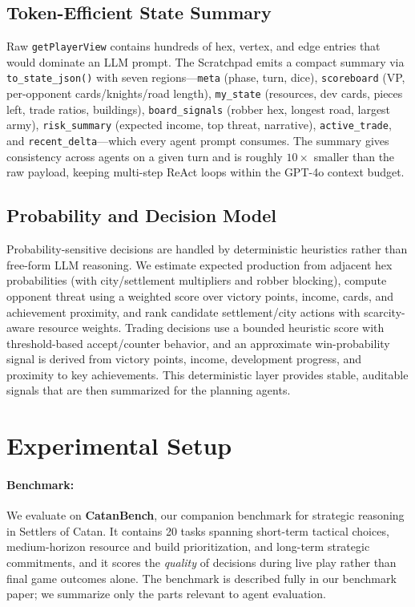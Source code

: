 \documentclass{article} %
\begin{document}
\subsection{Token-Efficient State Summary}
\label{sec:summary}

Raw \texttt{getPlayerView} contains hundreds of hex, vertex, and edge entries that would dominate an LLM prompt. The Scratchpad emits a compact summary via \texttt{to\_state\_json()} with seven regions---\texttt{meta} (phase, turn, dice), \texttt{scoreboard} (VP, per-opponent cards/knights/road length), \texttt{my\_state} (resources, dev cards, pieces left, trade ratios, buildings), \texttt{board\_signals} (robber hex, longest road, largest army), \texttt{risk\_summary} (expected income, top threat, narrative), \texttt{active\_trade}, and \texttt{recent\_delta}---which every agent prompt consumes. The summary gives consistency across agents on a given turn and is roughly $10\times$ smaller than the raw payload, keeping multi-step ReAct loops within the GPT-4o context budget.

\subsection{Probability and Decision Model}
\label{sec:probs}

Probability-sensitive decisions are handled by deterministic heuristics rather than free-form LLM reasoning. We estimate expected production from adjacent hex probabilities (with city/settlement multipliers and robber blocking), compute opponent threat using a weighted score over victory points, income, cards, and achievement proximity, and rank candidate settlement/city actions with scarcity-aware resource weights. Trading decisions use a bounded heuristic score with threshold-based accept/counter behavior, and an approximate win-probability signal is derived from victory points, income, development progress, and proximity to key achievements. This deterministic layer provides stable, auditable signals that are then summarized for the planning agents.

\section{Experimental Setup}
\label{sec:setup}

\paragraph{Benchmark:} We evaluate on \textbf{CatanBench}, our companion benchmark for strategic reasoning in Settlers of Catan. It contains 20 tasks spanning short-term tactical choices, medium-horizon resource and build prioritization, and long-term strategic commitments, and it scores the \emph{quality} of decisions during live play rather than final game outcomes alone. The benchmark is described fully in our benchmark paper; we summarize only the parts relevant to agent evaluation.
\end{document}
